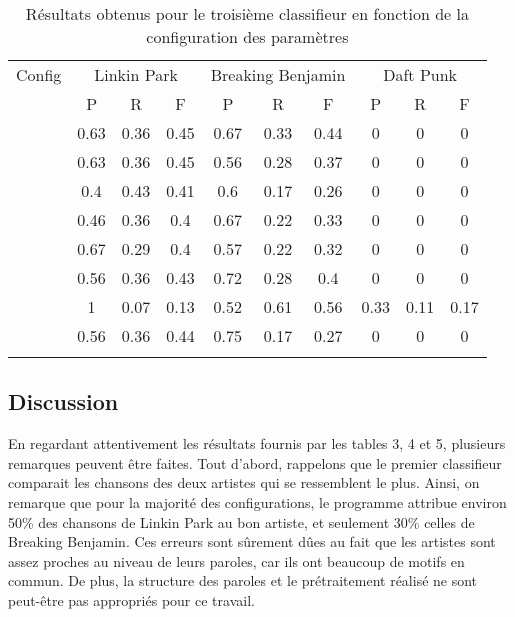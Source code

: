 \documentclass[a4paper]{article}
\begin{document}
\begin{table}[!htb]
          \centering
          \begin{tabular}{cccccccccc}
          \noalign{\smallskip} \hline \hline \noalign{\smallskip}
          Config & \multicolumn{3}{c}{Linkin Park} & \multicolumn{3}{c}{Breaking Benjamin} & \multicolumn{3}{c}{Daft Punk}\\
          ~ & P & R & F & P & R & F & P & R & F \\
          \hline \noalign{\smallskip}
          \no 1 & 0.63 & 0.36 & 0.45 & 0.67 & 0.33 & 0.44 & 0 & 0 & 0\\ 
          \no 2 & 0.63 & 0.36 & 0.45 & 0.56 & 0.28 & 0.37 & 0 & 0 & 0\\ 
          \no 3 & 0.4 & 0.43 & 0.41 & 0.6 & 0.17 & 0.26 & 0 & 0 & 0\\ 
          \no 4 & 0.46 & 0.36 & 0.4 & 0.67 & 0.22 & 0.33 & 0 & 0 & 0\\ 
          \no 5 & 0.67 & 0.29 & 0.4 & 0.57 & 0.22 & 0.32 & 0 & 0 & 0\\ 
          \no 6 & 0.56 & 0.36 & 0.43 & 0.72 & 0.28 & 0.4 & 0 & 0 & 0\\ 
          \no 7 & 1 & 0.07 & 0.13 & 0.52 & 0.61 & 0.56 & 0.33 & 0.11 & 0.17\\ 
          \no 8 & 0.56 & 0.36 & 0.44 & 0.75 & 0.17 & 0.27 & 0 & 0 & 0\\
          \noalign{\smallskip} \hline \noalign{\smallskip}
          \end{tabular}
          \caption{Résultats obtenus pour le troisième classifieur en fonction de la configuration des paramètres}
	\end{table}
	
	\subsection{Discussion}
	
	En regardant attentivement les résultats fournis par les tables 3, 4 et 5, plusieurs remarques peuvent être faites. Tout d'abord, rappelons que le premier classifieur comparait les chansons des deux artistes qui se ressemblent le plus. Ainsi, on remarque que pour la majorité des configurations, le programme attribue environ 50\% des chansons de Linkin Park au bon artiste, et seulement 30\% celles de Breaking Benjamin. Ces erreurs sont sûrement dûes au fait que les artistes sont assez proches au niveau de leurs paroles, car ils ont beaucoup de motifs en commun. De plus, la structure des paroles et le prétraitement réalisé ne sont peut-être pas appropriés pour ce travail.\\
	
\end{document}
